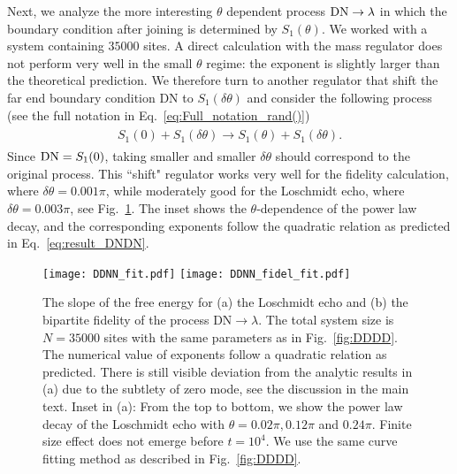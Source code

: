 Next, we analyze the more interesting $\theta$ dependent process ${\rm DN} \rightarrow \lambda$
in which the boundary condition after joining is determined by $S_1(\theta)$. We worked with a system containing $35000$ sites. A direct calculation with the mass regulator does not perform very well in the small $\theta$ regime: the exponent is slightly larger than the theoretical prediction. We therefore turn to another regulator that shift the far end boundary condition DN to $S_1( \delta \theta )$ and consider the following process (see the full notation in Eq.~\eqref{eq:Full_notation_rand()})
\begin{eqnarray}\begin{aligned}
\label{eq:approx_DNDN}
S_1(0)+S_1(\delta\theta)\rightarrow S_1(\theta)+S_1(\delta\theta).
\end{aligned}\end{eqnarray}
Since ${\rm DN} = S_1 (0 )$, taking smaller and smaller $\delta \theta$ should correspond to the original process. This ``shift" regulator works very well for the fidelity calculation, where $\delta \theta = 0.001 \pi$, while moderately good for the Loschmidt echo, where $\delta \theta = 0.003\pi$, see Fig.~\ref{fig:DDNN}. The inset shows the $\theta$-dependence of the power law decay, and the corresponding exponents follow the quadratic relation as predicted in Eq.~\eqref{eq:result_DNDN}. %

\begin{figure}
  \centering
\texttt{[image: DDNN\_fit.pdf]}
\texttt{[image: DDNN\_fidel\_fit.pdf]}
    \caption{The slope of the free energy for (a) the Loschmidt echo and (b) the bipartite fidelity of the process $\text{DN} \rightarrow \lambda$. {\iffalse in Eq.~\eqref{eq:DNDN}\fi} The total system size is $N=35000$ sites with the same parameters as in Fig.~\ref{fig:DDDD}. The numerical value of exponents follow a quadratic relation as predicted. There is still visible deviation from the analytic results in (a) due to the subtlety of zero mode, see the discussion in the main text. Inset in (a): From the top to bottom, we show the power law decay of the Loschmidt echo with $\theta=0.02\pi, 0.12\pi $ and $0.24\pi$. Finite size effect does not emerge before $t=10^{4}$. We use the same curve fitting method as described in Fig.~\ref{fig:DDDD}.}
      \label{fig:DDNN}
\end{figure}

